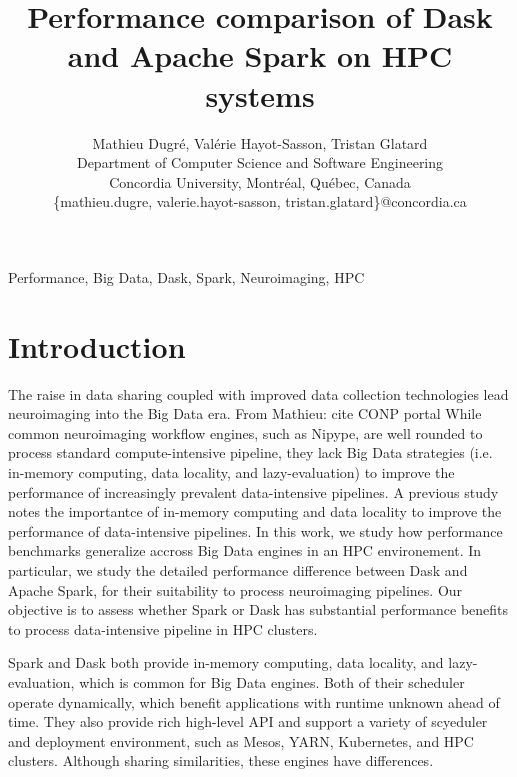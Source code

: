 \documentclass[conference]{IEEEtran}
\newcommand{\MD}[1]{\color{magenta}From Mathieu: #1 \color{black}}
\begin{document}
\title{Performance comparison of Dask and Apache Spark on HPC systems}

\author{Mathieu Dugr\'e, Val\'erie Hayot-Sasson, Tristan Glatard\\
	Department of Computer Science and Software Engineering\\
	Concordia University, Montr\'eal, Qu\'ebec, Canada\\
	\{mathieu.dugre, valerie.hayot-sasson, tristan.glatard\}@concordia.ca
	\vspace*{0.8cm} %
}

\maketitle

\begin{abstract}
\end{abstract}

\begin{IEEEkeywords}
	Performance, Big Data, Dask, Spark, Neuroimaging, HPC
\end{IEEEkeywords}

\section{Introduction}
The raise in data sharing coupled with improved data collection technologies lead neuroimaging into the Big Data era\cite{ALFAROALMAGRO:18, van2014human}. \MD{cite CONP portal}
While common neuroimaging workflow engines, such as Nipype\cite{Nipype:11}, are well rounded to process standard compute-intensive pipeline,
they lack Big Data strategies (i.e. in-memory computing, data locality, and lazy-evaluation) to improve the performance of increasingly prevalent data-intensive pipelines.
A previous study\cite{hayot2019performance} notes the importantce of in-memory computing and data locality to improve the performance of data-intensive pipelines.
In this work, we study how performance benchmarks generalize accross Big Data engines in an HPC environement.
In particular, we study the detailed performance difference between Dask\cite{Dask:15} and Apache Spark\cite{Spark:16}, for their suitability to process neuroimaging pipelines.
Our objective is to assess whether Spark or Dask has substantial performance benefits to process data-intensive pipeline in HPC clusters.

Spark and Dask both provide in-memory computing, data locality, and lazy-evaluation, which is common for Big Data engines.
Both of their scheduler operate dynamically, which benefit applications with runtime unknown ahead of time\cite{Dask:15}.
They also provide rich high-level API and support a variety of scyeduler and deployment environment, such as Mesos\cite{hindman2011mesos}, YARN\cite{vavilapalli2013apache}, Kubernetes, and HPC clusters.
Although sharing similarities, these engines have differences.
\end{document}
